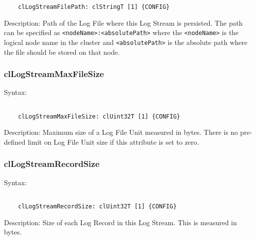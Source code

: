 \begin{flushleft}
\begin{Desc}
\begin{verbatim}
	clLogStreamFilePath: clStringT [1] {CONFIG}
	\end{verbatim}
	\normalsize
\end{Desc}

\begin{Desc}
 \item[Description:]
Path of the Log File where this Log Stream is persisted. The path can be specified as
\newline
{\tt{<nodeName>:<absolutePath>}}
\newline
where the {\tt{<nodeName>}} is the logical node name in the cluster and {\tt{<absolutePath>}} is the absolute path where the file should be stored
on that node.
\end{Desc}



\subsubsection{clLogStreamMaxFileSize}
\begin{Desc}
\item[Syntax:]
\footnotesize\begin{verbatim}        	

	clLogStreamMaxFileSize: clUint32T [1] {CONFIG}
	\end{verbatim}
	\normalsize
\end{Desc}

\begin{Desc}
 \item[Description:]
Maximum size of a Log File Unit measured in bytes. There is no pre-defined limit on
Log File Unit size if this attribute is set to zero.
\end{Desc}



\subsubsection{clLogStreamRecordSize}
\begin{Desc}
\item[Syntax:]
\footnotesize\begin{verbatim}        	

	clLogStreamRecordSize: clUint32T [1] {CONFIG}
	\end{verbatim}
	\normalsize
\end{Desc}

\begin{Desc}
 \item[Description:]
Size of each Log Record in this Log Stream. This is measured in bytes.
\end{Desc}



\end{flushleft}

